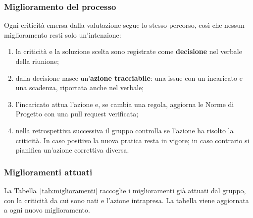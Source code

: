 \documentclass[documento]{gpt}
\begin{document}
	\subsubsection{Miglioramento del processo}
	Ogni criticità emersa dalla valutazione segue lo stesso percorso, così che
	nessun miglioramento resti solo un'intenzione:
	\begin{enumerate}
		\item la criticità e la soluzione scelta sono registrate come
		\textbf{decisione} nel verbale della riunione;
		\item dalla decisione nasce un'\textbf{azione tracciabile}: una issue con
		un incaricato e una scadenza, riportata anche nel verbale;
		\item l'incaricato attua l'azione e, se cambia una regola, aggiorna le
		Norme di Progetto con una pull request verificata;
		\item nella retrospettiva successiva il gruppo controlla se l'azione ha
		risolto la criticità. In caso positivo la nuova pratica resta in
		vigore; in caso contrario si pianifica un'azione correttiva diversa.
	\end{enumerate}
	
	\subsubsection{Miglioramenti attuati}
	La Tabella~\ref{tab:miglioramenti} raccoglie i miglioramenti già attuati dal
	gruppo, con la criticità da cui sono nati e l'azione intrapresa. La tabella
	viene aggiornata a ogni nuovo miglioramento.
	
\end{document}
